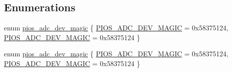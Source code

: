\subsection*{Enumerations}
\begin{DoxyCompactItemize}
\item 
enum \hyperlink{group___p_i_o_s___a_d_c_gad4639b786d45b213ac842a0c4cf3e78d}{pios\-\_\-adc\-\_\-dev\-\_\-magic} \{ \hyperlink{group___p_i_o_s___a_d_c_ggad4639b786d45b213ac842a0c4cf3e78dab432edba8e4a3348b2f28cf7edf94f79}{P\-I\-O\-S\-\_\-\-A\-D\-C\-\_\-\-D\-E\-V\-\_\-\-M\-A\-G\-I\-C} = 0x58375124, 
\hyperlink{group___p_i_o_s___a_d_c_ggad4639b786d45b213ac842a0c4cf3e78dab432edba8e4a3348b2f28cf7edf94f79}{P\-I\-O\-S\-\_\-\-A\-D\-C\-\_\-\-D\-E\-V\-\_\-\-M\-A\-G\-I\-C} = 0x58375124
 \}
\item 
enum \hyperlink{group___p_i_o_s___a_d_c_gad4639b786d45b213ac842a0c4cf3e78d}{pios\-\_\-adc\-\_\-dev\-\_\-magic} \{ \hyperlink{group___p_i_o_s___a_d_c_ggad4639b786d45b213ac842a0c4cf3e78dab432edba8e4a3348b2f28cf7edf94f79}{P\-I\-O\-S\-\_\-\-A\-D\-C\-\_\-\-D\-E\-V\-\_\-\-M\-A\-G\-I\-C} = 0x58375124, 
\hyperlink{group___p_i_o_s___a_d_c_ggad4639b786d45b213ac842a0c4cf3e78dab432edba8e4a3348b2f28cf7edf94f79}{P\-I\-O\-S\-\_\-\-A\-D\-C\-\_\-\-D\-E\-V\-\_\-\-M\-A\-G\-I\-C} = 0x58375124
 \}
\end{DoxyCompactItemize}
